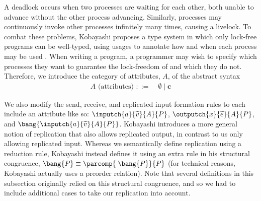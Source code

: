 %
A deadlock occurs when two processes are waiting for each other, both unable to advance without the other process advancing. Similarly, processes may continuously invoke other processes infinitely many times, causing a livelock. To combat these problems, Kobayashi proposes a type system in which only lock-free programs can be well-typed, using usages to annotate how and when each process may be used \cite{Kobayashi2000}. When writing a program, a programmer may wish to specify which processes they want to guarantee the lock-freedom of and which they do not. Therefore, we introduce the category of attributes, $A$, of the abstract syntax
\begin{align*}
    A \text{ (attributes) } ::=&\; \emptyset \mid \mathbf{c}
\end{align*}

We also modify the send, receive, and replicated input formation rules to each include an attribute like so: %
$\inputch{a}{\widetilde{v}}{A}{P}$, $\outputch{x}{\widetilde{e}}{A}{P}$, and$\; \bang{\inputch{a}{\widetilde{v}}{A}{P}}$. Kobayashi introduces a more general notion of replication that also allows replicated output, in contrast to us only allowing replicated input. Whereas we semantically define replication using a reduction rule, Kobayashi instead defines it using an extra rule in his structural congruence, $\bang{P} \equiv \parcomp{\;\bang{P}}{P}$ (for technical reasons, Kobayashi actually uses a preorder relation). Note that several definitions in this subsection originally relied on this structural congruence, and so we had to include additional cases to take our replication into account.\\

